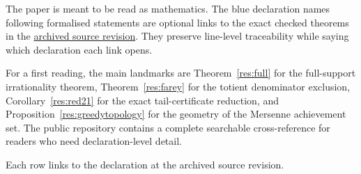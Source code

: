 \documentclass[11pt]{article}
\newcommand{\commit}{81150c1c6fdd4cd51e76d3aa0de344341e0e9e7c}
\newcommand{\sourceurl}{https://github.com/wcook04/plectis-lean-erdos249-257/tree/\commit}
\theoremstyle{definition}
\theoremstyle{remark}
\begin{document}
The paper is meant to be read as mathematics. The blue declaration names
following formalised statements are optional links to the exact checked
theorems in the \href{\sourceurl}{archived source revision}. They preserve
line-level traceability while saying which declaration each link opens.

For a first reading, the main landmarks are Theorem~\ref{res:full} for the
full-support irrationality theorem, Theorem~\ref{res:farey} for the totient
denominator exclusion, Corollary~\ref{res:red21} for the exact
tail-certificate reduction, and Proposition~\ref{res:greedytopology} for the
geometry of the Mersenne achievement set. The public repository contains a
complete searchable cross-reference for readers who need declaration-level
detail.

\iffalse

Each row links to the declaration at the archived source revision.
\end{document}
